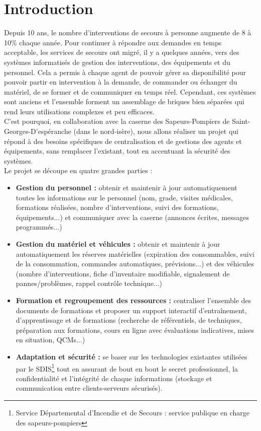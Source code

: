 \section{Introduction}

Depuis 10 ans, le nombre d'interventions de secours à personne augmente de 8 à 10\% chaque année. Pour continuer à répondre aux demandes en temps acceptable, les services de secours ont migré, il y a quelques années, vers des systèmes informatisés de gestion des interventions, des équipements et du personnel. Cela a permis à chaque agent de pouvoir gérer sa disponibilité pour pouvoir partir en intervention à la demande, de commander ou échanger du matériel, de se former et de communiquer en temps réel. Cependant, ces systèmes sont anciens et l’ensemble forment un assemblage de briques bien séparées qui rend leurs utilisations complexes et peu efficaces. \\

C’est pourquoi, en collaboration avec la caserne des Sapeurs-Pompiers de Saint-Georges-D’espéranche (dans le nord-isère), nous allons réaliser un projet qui répond à des besoins spécifiques de centralisation et de gestions des agents et équipements, sans remplacer l'existant, tout en accentuant la sécurité des systèmes. \\

Le projet se découpe en quatre grandes parties :
\begin{itemize}
  \item \textbf{Gestion du personnel :} obtenir et maintenir à jour automatiquement toutes les informations sur le personnel (nom, grade, visites médicales, formations réalisées, nombre d'interventions, suivi des formations, équipements...) et communiquer avec la caserne (annonces écrites, messages programmés...)\\
  \item \textbf{Gestion du matériel et véhicules :} obtenir et maintenir à jour automatiquement les réserves matérielles (expiration des consommables, suivi de la consommation, commandes automatiques, prévisions...) et des véhicules (nombre d'interventions, fiche d'inventaire modifiable, signalement de pannes/problèmes, rappel contrôle technique...)\\
  \item \textbf{Formation et regroupement des ressources :} centraliser l'ensemble des documents de formations et proposer un support interactif d’entraînement, d'apprentissage et de formations (recherche de référentiels, de techniques, préparation aux formations, cours en ligne avec évaluations indicatives, mises en situation, QCMs...)\\
  \item \textbf{Adaptation et sécurité : } se baser sur les technologies existantes utilisées par le SDIS\footnote{Service Départemental d'Incendie et de Secours : service publique en charge des sapeurs-pompiers} tout en assurant de bout en bout le secret professionnel, la confidentialité et l'intégrité de chaque informations (stockage et communication entre clients-serveurs sécurisés).
\end{itemize}